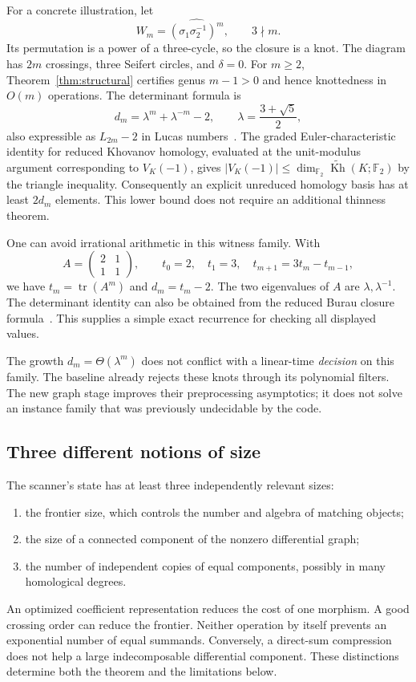 \documentclass[11pt,letterpaper]{article}
\newcommand{\F}{\mathbb F_2}
\newcommand{\rKh}{\widetilde{\operatorname{Kh}}}
\begin{document}
For a concrete illustration, let
\[
 W_m=\widehat{(\sigma_1\sigma_2^{-1})^m},\qquad 3\nmid m.
\]
Its permutation is a power of a three-cycle, so the closure is a knot.
The diagram has $2m$ crossings, three Seifert circles, and $\delta=0$.
For $m\ge2$, Theorem~\ref{thm:structural} certifies genus $m-1>0$ and hence
knottedness in $O(m)$ operations. The determinant formula is
\begin{equation}\label{eq:weavingdet}
 d_m=\lambda^m+\lambda^{-m}-2,
 \qquad \lambda=\frac{3+\sqrt5}{2},
\end{equation}
also expressible as $L_{2m}-2$ in Lucas numbers~\cite{weaving}.
The graded Euler-characteristic identity for reduced Khovanov homology,
evaluated at the unit-modulus argument corresponding to $V_K(-1)$, gives
$|V_K(-1)|\le\dim_{\F}\rKh(K;\F)$ by the triangle inequality.
Consequently an explicit unreduced homology basis has at least $2d_m$
elements. This lower bound does not require an additional thinness theorem.

One can avoid irrational arithmetic in this witness family. With
\[
 A=\begin{pmatrix}2&1\\1&1\end{pmatrix},\qquad
 t_0=2,\quad t_1=3,\quad t_{m+1}=3t_m-t_{m-1},
\]
we have $t_m=\operatorname{tr}(A^m)$ and $d_m=t_m-2$. The two eigenvalues of
$A$ are $\lambda,\lambda^{-1}$. The determinant identity can also be obtained
from the reduced Burau closure formula~\cite{morton}. This supplies a simple
exact recurrence for checking all displayed values.

The growth $d_m=\Theta(\lambda^m)$ does not conflict with a linear-time
\emph{decision} on this family. The baseline already rejects these knots
through its polynomial filters. The new graph stage improves their
preprocessing asymptotics; it does not solve an instance family that was
previously undecidable by the code.

\subsection{Three different notions of size}
The scanner's state has at least three independently relevant sizes:
\begin{enumerate}
\item the frontier size, which controls the number and algebra of matching
objects;
\item the size of a connected component of the nonzero differential graph;
\item the number of independent copies of equal components, possibly in
many homological degrees.
\end{enumerate}
An optimized coefficient representation reduces the cost of one morphism.
A good crossing order can reduce the frontier. Neither operation by itself
prevents an exponential number of equal summands. Conversely, a direct-sum
compression does not help a large indecomposable differential component.
These distinctions determine both the theorem and the limitations below.
\end{document}
